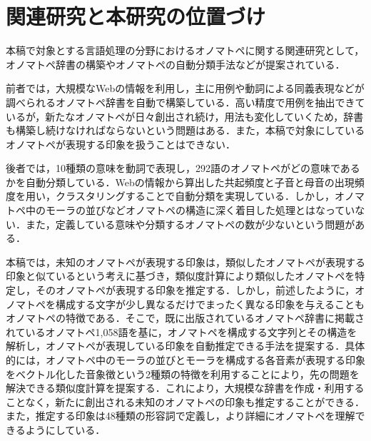 \documentclass[japanese]{jnlp_1.4}
\newcommand{\addtext}[1]{}
\begin{document}
\section{関連研究と本研究の位置づけ}

\addtext{オノマトペは，感覚と強く関連する言葉であることから，心理学や認知科学など幅広い分野で研究対象とされている．例えば，映像などの視覚や音などの聴覚から感じる印象をオノマトペを用いて調査し，人が感じる印象とオノマトペとの関係性を抽出したり}
\addtext{{\cite{Article_10,Article_11,Article_12,Article_13}}，味覚の官能評価においてその評価項目としてオノマトペが利用され，オノマトペと食品の硬さを示}
\addtext{す応力との関連性を評価したりしている{\cite{Article_14,Article_15}}．}

本稿で対象とする言語処理の分野におけるオノマトペに関する関連研究として，オノマトペ辞書の構築\cite{Article_01,Article_02}やオノマトペの自動分類手法\cite{Article_03}などが提案されている．

前者では，大規模なWebの情報を利用し，主に用例や動詞による同義表現などが調べられるオノマトペ辞書を自動で構築している．高い精度で用例を抽出できているが，新たなオノマトペが日々創出され続け，用法も変化していくため，辞書も構築し続けなければならないという問題はある．また，本稿で対象にしているオノマトペが表現する印象を扱うことはできない．

後者では，10種類の意味を動詞で表現し，292語のオノマトペがどの意味であるかを自動分類している．Webの情報から算出した共起頻度と子音と母音の出現頻度を用い，クラスタリングすることで自動分類を実現している．しかし，オノマトペ中のモーラの並びなどオノマトペの構造に深く着目した処理とはなっていない．また，定義している意味や分類するオノマトペの数が少ないという問題がある．

本稿では，未知のオノマトペが表現する印象は，類似したオノマトペが表現する印象と似ているという考えに基づき，類似度計算により類似したオノマトペを特定し，そのオノマトペが表現する印象を推定する．しかし，前述したように，オノマトペを構成する文字が少し異なるだけでまったく異なる印象を与えることもオノマトペの特徴である．そこで，既に出版されているオノマトペ辞書\cite{Book_01}に掲載されているオノマトペ1,058語を基に，オノマトペを構成する文字列とその構造を解析し，オノマトペが表現している印象を自動推定できる手法を提案する．具体的には，オノマトペ中のモーラの並びとモーラを構成する各音素が表現する印象をベクトル化した音象徴という2種類の特徴を利用することにより，先の問題を解決できる類似度計算を提案する．これにより，大規模な辞書を作成・利用することなく，新たに創出される未知のオノマトペの印象も推定することができる．また，推定する印象は48種類の形容詞で定義し，より詳細にオノマトペを理解できるようにしている．
\end{document}
